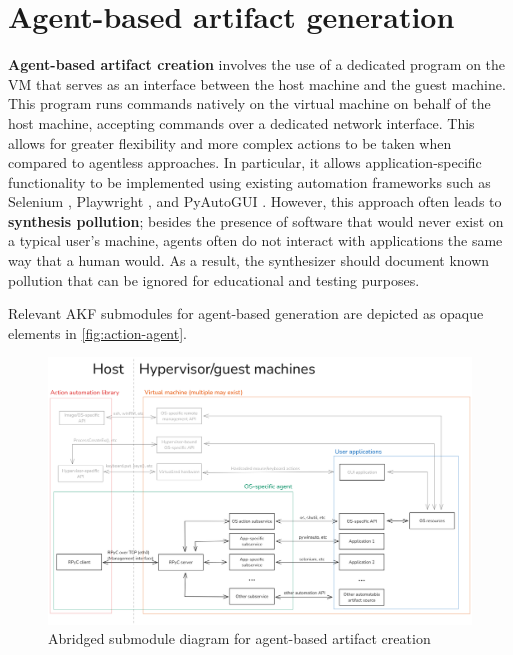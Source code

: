 \documentclass[letterpaper,12pt]{report}
\begin{document}
\section{Agent-based artifact
generation}\label{agent-based-artifact-generation}

\textbf{Agent-based artifact creation} involves the use of a dedicated
program on the VM that serves as an interface between the host machine
and the guest machine. This program runs commands natively on the
virtual machine on behalf of the host machine, accepting commands over a
dedicated network interface. This allows for greater flexibility and
more complex actions to be taken when compared to agentless approaches.
In particular, it allows application-specific functionality to be
implemented using existing automation frameworks such as Selenium
\cite{SeleniumHQSelenium2025}, Playwright
\cite{MicrosoftPlaywrightpython2025}, and PyAutoGUI
\cite{sweigartAsweigartPyautogui2025}. However, this approach often
leads to \textbf{synthesis pollution}; besides the presence of software
that would never exist on a typical user's machine, agents often do not
interact with applications the same way that a human would. As a result,
the synthesizer should document known pollution that can be ignored for
educational and testing purposes.

Relevant AKF submodules for agent-based generation are depicted as
opaque elements in \autoref{fig:action-agent}.

\begin{figure}[h]
\centering
\includegraphics[width=1\linewidth]{action-agent.png}
\caption{Abridged submodule diagram for agent-based artifact
creation}\label{fig:action-agent}
\end{figure}
\end{document}
